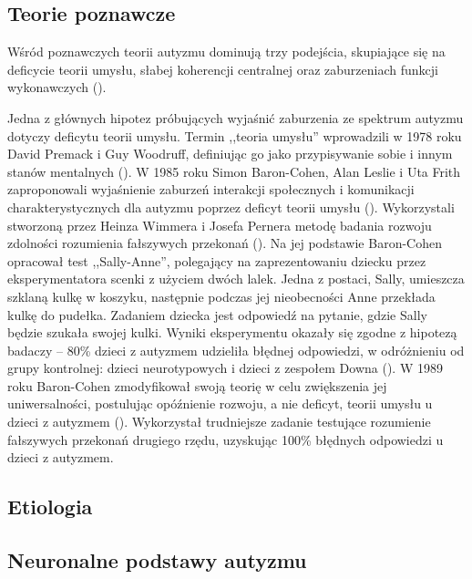     \subsection{Teorie poznawcze}
    Wśród poznawczych teorii autyzmu dominują trzy podejścia, skupiające się na deficycie teorii umysłu, słabej koherencji centralnej oraz zaburzeniach funkcji wykonawczych (\cite{rajendran2007cognitive}).
    
    Jedna z głównych hipotez próbujących wyjaśnić zaburzenia ze spektrum autyzmu dotyczy deficytu teorii umysłu. Termin ,,teoria umysłu'' wprowadzili w 1978 roku David Premack i Guy Woodruff, definiując go jako przypisywanie sobie i innym stanów mentalnych (\cite{premack1978does}).
    W 1985 roku Simon Baron-Cohen, Alan Leslie i Uta Frith zaproponowali wyjaśnienie zaburzeń interakcji społecznych i komunikacji charakterystycznych dla autyzmu poprzez deficyt teorii umysłu (\cite{baron1985does}).
    Wykorzystali stworzoną przez Heinza Wimmera i Josefa Pernera metodę badania rozwoju zdolności rozumienia fałszywych przekonań (\cite{wimmer1983beliefs}).
    Na jej podstawie Baron-Cohen opracował test ,,Sally-Anne'', polegający na zaprezentowaniu dziecku przez eksperymentatora scenki z użyciem dwóch lalek.
    Jedna z postaci, Sally, umieszcza szklaną kulkę w koszyku, następnie podczas jej nieobecności Anne przekłada kulkę do pudełka.
    Zadaniem dziecka jest odpowiedź na pytanie, gdzie Sally będzie szukała swojej kulki.
    Wyniki eksperymentu okazały się zgodne z hipotezą badaczy -- 80\% dzieci z autyzmem udzieliła błędnej odpowiedzi, w odróżnieniu od grupy kontrolnej: dzieci neurotypowych i dzieci z zespołem Downa (\cite{baron1985does}).
    W 1989 roku Baron-Cohen zmodyfikował swoją teorię w celu zwiększenia jej uniwersalności, postulując opóźnienie rozwoju, a nie deficyt, teorii umysłu u dzieci z autyzmem (\cite{baron1989autistic}).
    Wykorzystał trudniejsze zadanie testujące rozumienie fałszywych przekonań drugiego rzędu, uzyskując 100\% błędnych odpowiedzi u dzieci z autyzmem.
    
    
    
    \subsection{Etiologia}
    
    \subsection{Neuronalne podstawy autyzmu}

